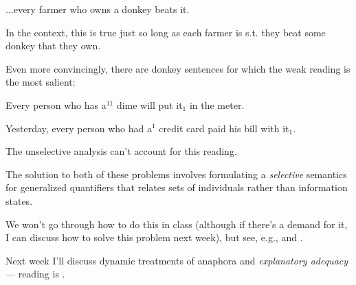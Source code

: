 \documentclass[nols,twoside,nofonts,nobib,nohyper]{tufte-handout}
\theoremstyle{definition}
\begin{document}
\ex
...every farmer who owns a donkey beats it.
\xe

In the context, this is true just so long as each farmer is s.t. they beat some donkey that they own.

Even more convincingly, there are donkey sentences for which the weak reading is the most salient:

\ex
Every person who has a$^{11}$ dime will put it$_{1}$ in the meter.
\xe

\ex
Yesterday, every person who had a$^{1}$ credit card paid his bill with it$_{1}$.
\xe

The unselective analysis can't account for this reading.

The solution to both of these problems involves formulating a \textit{selective} semantics for generalized quantifiers that relates sets of individuals rather than information states.

We won't go through how to do this in class (although if there's a demand for it, I can discuss how to solve this problem next week), but see, e.g., \cite{Chierchia1995} and \cite{Kanazawa1994}.

\begin{tcolorbox}[title=Next time]
Next week I'll discuss dynamic treatments of anaphora and \textit{explanatory adequacy} --- reading is \cite{Mandelkern2020a}.
\end{tcolorbox}

\printbibliography
\end{document}
